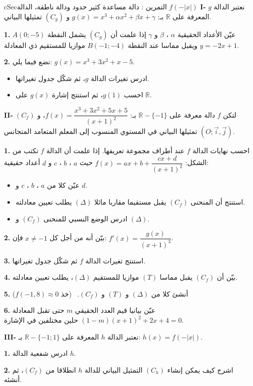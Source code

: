 \documentclass[12pt,a4paper]{article}
\newenvironment{BOX}[2]{\begin{otherlanguage}{english}\begin{arbox}{#1}{#2}}{\end{arbox}\end{otherlanguage}}
\newcounter{exo}
\newenvironment{tamrin}[1]{\stepcounter{exo}\begin{BOX}{cSec}{التمرين \theexo: #1}}{\end{BOX}}
\newcommand{\R}{\mathbb{R}}
\newenvironment{sq}{\begin{itemize}[leftmargin=2.4em,itemsep=3pt]}{\end{itemize}}
\newcommand{\qa}{\item[(أ)]}\newcommand{\qb}{\item[(ب)]}\newcommand{\qc}{\item[(جـ)]}\newcommand{\qd}{\item[(د)]}\newcommand{\qe}{\item[(هـ)]}
\newcommand{\QQ}[1]{\par\smallskip\textbf{#1.} }
\begin{document}
\begin{tamrin}{دالة مساعدة كثير حدود ودالة ناطقة، الدالة $f(-|x|)$}
\textbf{I-} نعتبر الدالة $g$ المعرفة على $\R$ بـ: $g(x)=x^{3}+\alpha x^{2}+\beta x+\gamma$ و $(C_g)$ تمثيلها البياني.
\QQ{1} عيّن الأعداد الحقيقية $\alpha$ ، $\beta$ و $\gamma$ إذا علمت أن $(C_g)$ يشمل النقطة $A(0;-5)$ ويقبل مماسا عند النقطة $B(-1;-4)$ موازيا للمستقيم ذي المعادلة $y=-2x+1$.
\QQ{2} نضع فيما يلي: $g(x)=x^{3}+3x^{2}+x-5$.
\begin{sq}
\qa ادرس تغيرات الدالة $g$، ثم شكّل جدول تغيراتها.
\qb احسب $g(1)$، ثم استنتج إشارة $g(x)$ على $\R$.
\end{sq}
\textbf{II-} لتكن $f$ دالة معرفة على $\R-\{-1\}$ بـ: $f(x)=\dfrac{x^{3}+3x^{2}+5x+5}{(x+1)^{2}}$، و $(C_f)$ تمثيلها البياني في المستوي المنسوب إلى المعلم المتعامد المتجانس $\left(O;\vec{i},\vec{j}\right)$.
\QQ{1} احسب نهايات الدالة $f$ عند أطراف مجموعة تعريفها. إذا علمت أن الدالة $f$ تكتب من الشكل: $f(x)=ax+b+\dfrac{cx+d}{(x+1)^{2}}$ حيث $a$ ، $b$ ، $c$ و $d$ أعداد حقيقية:
\begin{sq}
\qa عيّن كلا من $a$ ، $b$ ، $c$ و $d$.
\qb استنتج أن المنحنى $(C_f)$ يقبل مستقيما مقاربا مائلا $(\Delta)$ يطلب تعيين معادلته.
\qc ادرس الوضع النسبي للمنحنى $(C_f)$ و $(\Delta)$.
\end{sq}
\QQ{2} بيّن أنه من أجل كل $x\neq-1$ فإن: $f'(x)=\dfrac{g(x)}{(x+1)^{3}}$.
\QQ{3} استنتج تغيرات الدالة $f$ ثم شكّل جدول تغيراتها.
\QQ{4} بيّن أن $(C_f)$ يقبل مماسا $(T)$ موازيا للمستقيم $(\Delta)$، يطلب تعيين معادلته.
\QQ{5} أنشئ كلا من $(\Delta)$ و $(T)$ و $(C_f)$. \ (خذ $f(-1{,}8)\approx0$)
\QQ{6} عيّن بيانيا قيم العدد الحقيقي $m$ حتى تقبل المعادلة $(1-m)(x+1)^{2}+2x+4=0$ حلين مختلفين في الإشارة.

\textbf{III-} نعتبر الدالة $h$ المعرفة على $\R-\{-1;1\}$ بـ: $h(x)=f(-|x|)$.
\QQ{1} ادرس شفعية الدالة $h$.
\QQ{2} اشرح كيف يمكن إنشاء $(C_h)$ التمثيل البياني للدالة $h$ انطلاقا من $(C_f)$، ثم أنشئه.
\end{tamrin}
\end{document}

